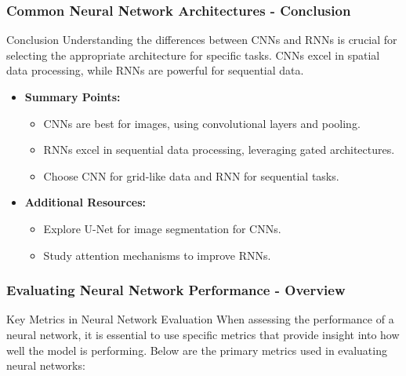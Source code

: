 \documentclass[aspectratio=169]{beamer}
\begin{document}
\begin{frame}[fragile]
    \frametitle{Common Neural Network Architectures - Conclusion}
    \begin{block}{Conclusion}
        Understanding the differences between CNNs and RNNs is crucial for selecting the appropriate architecture for specific tasks. CNNs excel in spatial data processing, while RNNs are powerful for sequential data.
    \end{block}
    
    \begin{itemize}
        \item \textbf{Summary Points:}
            \begin{itemize}
                \item CNNs are best for images, using convolutional layers and pooling.
                \item RNNs excel in sequential data processing, leveraging gated architectures.
                \item Choose CNN for grid-like data and RNN for sequential tasks.
            \end{itemize}
        \item \textbf{Additional Resources:}
            \begin{itemize}
                \item Explore U-Net for image segmentation for CNNs.
                \item Study attention mechanisms to improve RNNs.
            \end{itemize}
    \end{itemize}
\end{frame}

\begin{frame}[fragile]
    \frametitle{Evaluating Neural Network Performance - Overview}
    \begin{block}{Key Metrics in Neural Network Evaluation}
        When assessing the performance of a neural network, it is essential to use specific metrics that provide insight into how well the model is performing. Below are the primary metrics used in evaluating neural networks:
    \end{block}
\end{frame}
\end{document}
